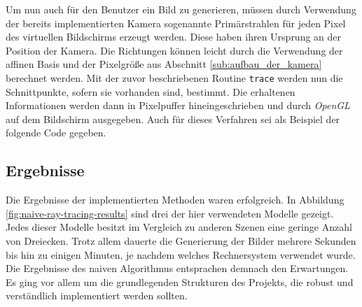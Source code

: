 \documentclass[crop=false]{standalone}
\begin{document}
      Um nun auch für den Benutzer ein Bild zu generieren, müssen durch Verwendung der bereits implementierten Kamera sogenannte Primärstrahlen für jeden Pixel des virtuellen Bildschirms erzeugt werden.
      Diese haben ihren Ursprung an der Position der Kamera.
      Die Richtungen können leicht durch die Verwendung der affinen Basis und der Pixelgröße aus Abschnitt \ref{sub:aufbau_der_kamera} berechnet werden.
      Mit der zuvor beschriebenen Routine \texttt{trace} werden nun die Schnittpunkte, sofern sie vorhanden sind, bestimmt.
      Die erhaltenen Informationen werden dann in Pixelpuffer hineingeschrieben und durch \textit{OpenGL} auf dem Bildschirm ausgegeben.
      Auch für dieses Verfahren sei als Beispiel der folgende Code gegeben.


    \subsection{Ergebnisse} %
    \label{sub:ergebnisse}
      Die Ergebnisse der implementierten Methoden waren erfolgreich.
      In Abbildung \ref{fig:naive-ray-tracing-results} sind drei der hier verwendeten Modelle gezeigt.
      Jedes dieser Modelle besitzt im Vergleich zu anderen Szenen eine geringe Anzahl von Dreiecken.
      Trotz allem dauerte die Generierung der Bilder mehrere Sekunden bis hin zu einigen Minuten, je nachdem welches Rechnersystem verwendet wurde.
      Die Ergebnisse des naiven Algorithmus entsprachen demnach den Erwartungen.
      Es ging vor allem um die grundlegenden Strukturen des Projekts, die robust und verständlich implementiert werden sollten.
\end{document}
